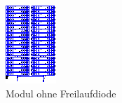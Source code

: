 \begin{figure}[h!tb]
    \centering
    \includegraphics[width=\textwidth]{images/ltspice/jac/jacModuleNoD.eps}
    \caption{Modul ohne Freilaufdiode}
    \label{fig:ltspice:jacModule:NoDiode}
\end{figure}

